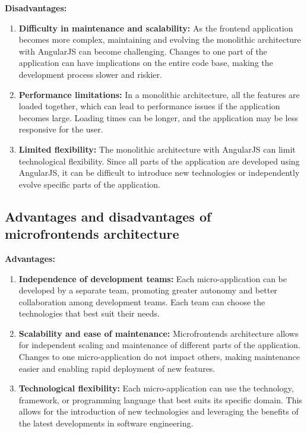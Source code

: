 \textbf{Disadvantages:}
\begin{enumerate}
\item \textbf{Difficulty in maintenance and scalability:} As the frontend application becomes more complex, maintaining and evolving the monolithic architecture with AngularJS can become challenging. Changes to one part of the application can have implications on the entire code base, making the development process slower and riskier.
\item \textbf{Performance limitations:} In a monolithic architecture, all the features are loaded together, which can lead to performance issues if the application becomes large. Loading times can be longer, and the application may be less responsive for the user.
\item \textbf{Limited flexibility:} The monolithic architecture with AngularJS can limit technological flexibility. Since all parts of the application are developed using AngularJS, it can be difficult to introduce new technologies or independently evolve specific parts of the application.
\end{enumerate}

\subsection{Advantages and disadvantages of microfrontends architecture}
\textbf{Advantages:}
\begin{enumerate}
\item \textbf{Independence of development teams:} Each micro-application can be developed by a separate team, promoting greater autonomy and better collaboration among development teams. Each team can choose the technologies that best suit their needs.
\item \textbf{Scalability and ease of maintenance:} Microfrontends architecture allows for independent scaling and maintenance of different parts of the application. Changes to one micro-application do not impact others, making maintenance easier and enabling rapid deployment of new features.
\item \textbf{Technological flexibility:} Each micro-application can use the technology, framework, or programming language that best suits its specific domain. This allows for the introduction of new technologies and leveraging the benefits of the latest developments in software engineering.
\end{enumerate}

